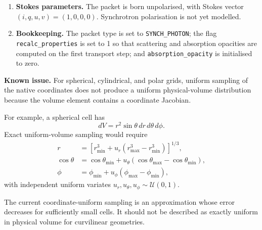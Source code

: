 \documentclass[12pt,a4paper]{article}
\newcommand{\code}[1]{\texttt{#1}}
\newenvironment{knownissue}{%
	\begin{framed}\noindent\textbf{Known issue.}\quad}
	{\end{framed}}
\begin{document}
\begin{enumerate}[leftmargin=2em]
	\item \textbf{Stokes parameters.}
	The packet is born unpolarised, with Stokes vector
	\((i, q, u, v) = (1, 0, 0, 0)\). Synchrotron polarisation
	is not yet modelled.
	
	\item \textbf{Bookkeeping.}
	The packet type is set to \code{SYNCH\_PHOTON}; the flag
	\code{recalc\_properties} is set to 1 so that scattering and
	absorption opacities are computed on the first transport step; and
	\code{absorption\_opacity} is initialised to zero.
\end{enumerate}

\begin{knownissue}
	For spherical, cylindrical, and polar grids, uniform sampling of the
	native coordinates does not produce a uniform physical-volume
	distribution because the volume element contains a coordinate Jacobian.
	
	For example, a spherical cell has
	\begin{equation}
		dV
		=
		r^2\sin\theta\,dr\,d\theta\,d\phi.
	\end{equation}
	Exact uniform-volume sampling would require
	\begin{align}
		r
		&=
		\left[
		r_{\min}^3
		+
		u_r\left(r_{\max}^3-r_{\min}^3\right)
		\right]^{1/3},\\
		\cos\theta
		&=
		\cos\theta_{\min}
		+
		u_\theta
		\left(
		\cos\theta_{\max}-\cos\theta_{\min}
		\right),\\
		\phi
		&=
		\phi_{\min}
		+
		u_\phi
		\left(\phi_{\max}-\phi_{\min}\right),
	\end{align}
	with independent uniform variates
	$u_r,u_\theta,u_\phi\sim\mathcal{U}(0,1)$.
	
	The current coordinate-uniform sampling is an approximation whose error
	decreases for sufficiently small cells. It should not be described as
	exactly uniform in physical volume for curvilinear geometries.
\end{knownissue}
\end{document}
